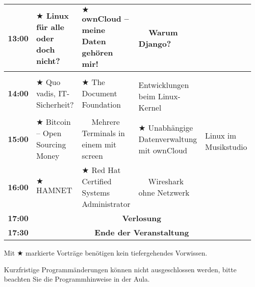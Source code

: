 \documentclass[10pt,a4paper,ngerman,landscape]{scrartcl}
\begin{document}
{\begin{table}[h!]
\begin{center}
\begin{tabular}{|c||l|l|l||l|}
            \bfseries{13:00} & \rule[-3mm]{0mm}{8mm} $\bigstar$ Linux für alle oder doch nicht? &
                                                     $\bigstar$ ownCloud -- meine Daten gehören mir! &
                                                     $\phantom{\bigstar}$ Warum Django? &
                                                     \\ \hline
            \bfseries{14:00} & \rule[-3mm]{0mm}{8mm} $\bigstar$ Quo vadis, IT-Sicherheit? &
                                                     $\bigstar$ The Document Foundation &
                                                     $\phantom{\bigstar}$ Entwicklungen beim Linux-Kernel &
                                                     \multirow{3}{*}{Linux im Musikstudio} \\ \cline{1-4}
            \bfseries{15:00} & \rule[-3mm]{0mm}{8mm} $\bigstar$ Bitcoin -- Open Sourcing Money &
                                                     $\phantom{\bigstar}$ Mehrere Terminals in einem mit screen &
                                                     $\bigstar$ Unabhängige Datenverwaltung mit ownCloud &
                                                     \\ \hline 
            \bfseries{16:00} & \rule[-3mm]{0mm}{8mm} $\bigstar$ HAMNET &
                                                    $\bigstar$ Red Hat Certified Systems Administrator &
                                                    $\phantom{\bigstar}$ Wireshark ohne Netzwerk &
                                                    \\ \hline 
            \bfseries{17:00} & \multicolumn{4}{c|}{\rule[-3mm]{0mm}{8mm}{\bfseries{Verlosung}}} \\ \hline
            \bfseries{17:30} & \multicolumn{4}{c|}{\rule[-3mm]{0mm}{8mm}{\bfseries{Ende der Veranstaltung}}} \\ \hline
          \end{tabular}
        \end{center}
\end{table} 
}
\vspace{-1.0em}
Mit $\bigstar$ markierte Vorträge benötigen kein tiefergehendes Vorwissen.

Kurzfristige Programmänderungen können nicht ausgeschlossen werden,
bitte beachten Sie die Programmhinweise in der Aula.
\end{document}
